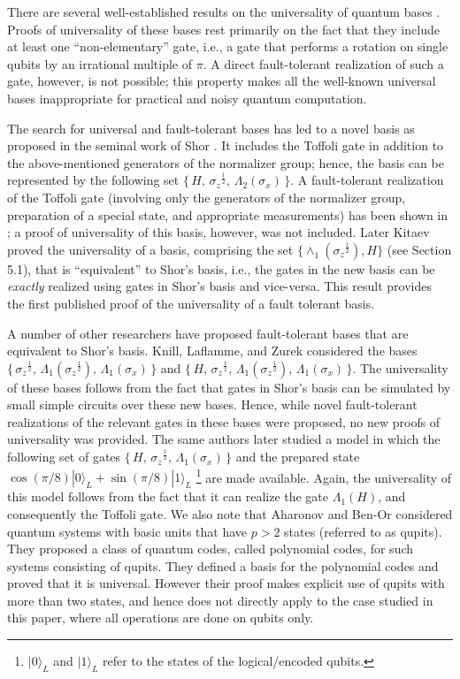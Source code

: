 \documentclass[twocolumn,11pt]{article}
\newcommand{\sqrtsz}{{\sigma_z}^{\frac{1}{2}}}
\begin{document}
There are several well-established results on the universality of quantum bases
\cite{adleman, barenco, egfqc, bernstein, deutsch89}.  Proofs of universality
of these bases rest primarily on the fact that they include at least one
``non-elementary'' gate, i.e., a gate that performs a rotation on single qubits 
by an irrational multiple of $\pi$.  A direct fault-tolerant realization of such 
a gate, however, is not possible; this property makes all the well-known 
universal bases inappropriate for practical and noisy quantum computation.

The search for universal and fault-tolerant bases has led to a novel
basis as proposed in the seminal work of Shor \cite{shorFT}. It includes 
the Toffoli gate in addition to the above-mentioned generators of the 
normalizer group; hence, the basis can be represented by the following set
 $\{\,H,\, {\sigma_z}^{\frac{1}{2}},\,
\Lambda_2(\sigma_x)\,\}$. A fault-tolerant realization of the Toffoli gate 
(involving only the generators of the normalizer group, 
preparation of a special state, and appropriate measurements) has been shown
in \cite{shorFT}; a proof of universality of this basis, however, was not included. 
Later Kitaev \cite{kitaevQC} proved the universality of a basis, comprising the set 
$\{\wedge_1(\sqrtsz), H\}$ (see Section 5.1), that is ``equivalent''
to Shor's basis, i.e., the gates in the  new basis can be {\em exactly} realized using gates
in Shor's basis and vice-versa. This result provides the first published proof
of the universality of a fault tolerant basis.

A number of other researchers have proposed fault-tolerant bases
that are equivalent to Shor's basis.  Knill, Laflamme, and
Zurek \cite{KLZ96} considered the bases
$\{\, {\sigma_z}^{\frac{1}{2}},\, \Lambda_1({\sigma_z}^{\frac{1}{2}}),\, 
\Lambda_1(\sigma_x)\,\}$  
and 
$\{\, H,\, {\sigma_z}^{\frac{1}{2}},\, \Lambda_1({\sigma_z}^{\frac{1}{2}}),\, 
\Lambda_1(\sigma_x)\,\}$. The universality of these bases follows from the
fact that gates in Shor's basis can be simulated by small simple
circuits over these new bases. Hence, while novel fault-tolerant realizations
of the relevant gates in these bases were proposed, no new proofs of universality
was provided. 
The same authors later \cite{KLZ} studied a model in which the following set of gates
$\{\,H,\, {\sigma_z}^{\frac{1}{2}},\, \Lambda_1(\sigma_x)\,\}$ and the prepared
state $\cos(\pi/8)|0\rangle_L+\sin(\pi/8)|1\rangle_L$ \footnote{$|0\rangle_L$ 
and $|1\rangle_L$ refer to the states of the logical/encoded qubits.} are made
available. Again, the universality of this model follows from the fact 
that it can realize the gate $\Lambda_1(H)$, and consequently the Toffoli gate. 
We also note that
Aharonov and Ben-Or \cite{aharonov1} considered quantum systems with basic 
units that have $p>2$ states (referred to as
qupits). They proposed a class of quantum codes,
called polynomial codes, for such systems consisting of qupits. They defined a basis for the
polynomial codes and proved that it is universal. However their proof makes explicit use of
qupits with more than two states, and hence does not directly apply to the case studied in this
paper, where all operations are done on qubits only.
\end{document}
